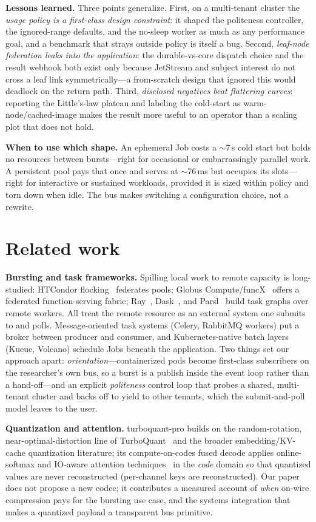 \documentclass[conference]{IEEEtran}
\begin{document}
\textbf{Lessons learned.} Three points generalize. First, on a multi-tenant cluster the
\emph{usage policy is a first-class design constraint}: it shaped the politeness controller, the
ignored-range defaults, and the no-sleep worker as much as any performance goal, and a benchmark
that strays outside policy is itself a bug. Second, \emph{leaf-node federation leaks into the
application}: the durable-vs-core dispatch choice and the result webhook both exist only because
JetStream and subject interest do not cross a leaf link symmetrically---a from-scratch design that
ignored this would deadlock on the return path. Third, \emph{disclosed negatives beat flattering
curves}: reporting the Little's-law plateau and labeling the cold-start as warm-node/cached-image
makes the result more useful to an operator than a scaling plot that does not hold.

\textbf{When to use which shape.} An ephemeral Job costs a $\sim$7\,s cold start but holds no
resources between bursts---right for occasional or embarrassingly parallel work. A persistent pool
pays that once and serves at $\sim$76\,ms but occupies its slots---right for interactive or
sustained workloads, provided it is sized within policy and torn down when idle. The bus makes
switching a configuration choice, not a rewrite.

\section{Related work}
\textbf{Bursting and task frameworks.} Spilling local work to remote capacity is long-studied:
HTCondor flocking~\cite{htcondor} federates pools; Globus Compute/funcX~\cite{funcx} offers a
federated function-serving fabric; Ray~\cite{ray}, Dask~\cite{dask}, and Parsl~\cite{parsl} build
task graphs over remote workers. All treat the remote resource as an external system one submits
to and polls. Message-oriented task systems (Celery, RabbitMQ workers) put a broker between
producer and consumer, and Kubernetes-native batch layers (Kueue, Volcano) schedule Jobs beneath
the application. Two things set our approach apart: \emph{orientation}---containerized pods become
first-class subscribers on the researcher's own bus, so a burst is a publish inside the event loop
rather than a hand-off---and an explicit \emph{politeness} control loop that probes a shared,
multi-tenant cluster and backs off to yield to other tenants, which the submit-and-poll model
leaves to the user.

\textbf{Quantization and attention.} turboquant-pro builds on the random-rotation,
near-optimal-distortion line of TurboQuant~\cite{turboquant} and the broader embedding/KV-cache
quantization literature; its compute-on-codes fused decode applies online-softmax and
IO-aware attention techniques~\cite{onlinesoftmax,flashattention} in the \emph{code} domain so that
quantized values are never reconstructed (per-channel keys are reconstructed). Our paper does not propose a new codec; it
contributes a measured account of \emph{when} on-wire compression pays for the bursting use case,
and the systems integration that makes a quantized payload a transparent bus primitive.
\end{document}
